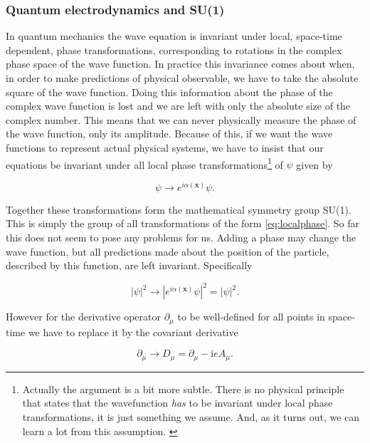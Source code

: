 \subsubsection{Quantum electrodynamics and SU(1)}
In quantum mechanics the wave equation is invariant under local, space-time dependent, phase transformations, corresponding to rotations in the complex phase space of the wave function. In practice this invariance comes about when, in order to make predictions of physical observable, we have to take the absolute square of the wave function. Doing this information about the phase of the complex wave function is lost and we are left with only the absolute size of the complex number. This means that we can never physically measure the phase of the wave function, only its amplitude. Because of this, if we want the wave functions to represent actual physical systems, we have to insist that our equations be invariant under all local phase transformations\footnote{Actually the argument is a bit more subtle. There is no physical principle that states that the wavefunction \emph{has} to be invariant under local phase transformations, it is just something we assume. And, as it turns out, we can learn a lot from this assumption. \cite{griffiths1987iep}} of $\psi$ given by

\begin{equation} \label{eq:localphase}
    \psi \rightarrow e^{i\alpha(\mathbf{x})} \psi.
\end{equation}

Together these transformations form the mathematical symmetry group SU(1). This is simply the group of all transformations of the form \eqref{eq:localphase}.  So far this does not seem to pose any problems for us. Adding a phase may change the wave function, but all predictions made about the position of the particle, described by this function, are left invariant. Specifically

\begin{equation}
	|\psi|^2 \rightarrow |e^{i\alpha(\mathbf{x})} \psi|^2 = |\psi|^2.
\end{equation}

However for the derivative operator $\partial_\mu$ to be well-defined for all points in space-time we have to replace it by the covariant derivative

\begin{equation} \label{eq:covariant}
	\partial_\mu \rightarrow D_\mu = \partial_\mu - \textrm{i}e A_\mu.
\end{equation}

